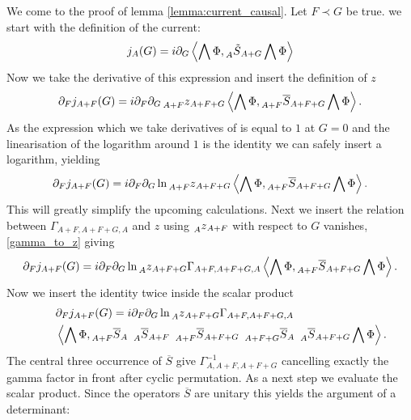 \documentclass[oneside,reqno,12pt]{amsart}
\begin{document}
We come to the proof of lemma \ref{lemma:current_causal}. Let \(F\prec G\) be true. we start with the definition of the current:
\begin{align*}
j_A(G)= i \partial_G \left\langle  \bigwedge \Phi, \prescript{}{A}{\tilde{S}}_{A+G} \bigwedge \Phi\right\rangle
\end{align*}
Now we take the derivative of this expression and insert the definition of \(z\)
\begin{align*}
\partial_F j_{A+F}(G)=i \partial_F \partial_G \prescript{}{A+F}{z}_{A+F+G} \left\langle  \bigwedge \Phi, \prescript{}{A+F}{\overline{S}}_{A+F+G} \bigwedge \Phi\right\rangle.
\end{align*}
As the expression which we take derivatives of is equal to \(1\) at \(G=0\) and the linearisation of the logarithm around \(1\) is the identity we can safely insert a logarithm, yielding
\begin{align*}
\partial_F j_{A+F}(G)=i \partial_F \partial_G \ln \prescript{}{A+F}{z}_{A+F+G} \left\langle  \bigwedge \Phi, \prescript{}{A+F}{\overline{S}}_{A+F+G} \bigwedge \Phi\right\rangle.
\end{align*}
This will greatly simplify the upcoming calculations. Next we insert the relation between \(\Gamma_{A+F,A+F+G,A}\) and \(z\) using \(\prescript{}{A}{z}_{A+F}\) with respect to \(G\) vanishes, \eqref{gamma_to_z} giving
\begin{align*}
\partial_F j_{A+F}(G)=i \partial_F \partial_G \ln  \prescript{}{A}{z}_{A+F+G} \Gamma_{A+F,A+F+G,A} \left\langle  \bigwedge \Phi, \prescript{}{A+F}{\overline{S}}_{A+F+G} \bigwedge \Phi\right\rangle.
\end{align*}
Now we insert the identity twice inside the scalar product
\begin{align}\tag*{}
&\partial_F j_{A+F}(G)=i \partial_F \partial_G \ln  \prescript{}{A}{z}_{A+F+G} \Gamma_{A+F,A+F+G,A} \\
&\left\langle  \bigwedge \Phi, \prescript{}{A+F}{\overline{S}}_A~ \prescript{}{A}{\overline{S}}_{A+F}~ \prescript{}{A+F}{\overline{S}}_{A+F+G}~ \prescript{}{A+F+G}{\overline{S}}_{A} ~\prescript{}{A}{\overline{S}}_{A+F+G}  \bigwedge \Phi\right\rangle.
\end{align}
The central three occurrence of \(\overline{S}\) give \(\Gamma^{-1}_{A,A+F,A+F+G}\) cancelling exactly the gamma factor in front after cyclic permutation. As a next step we evaluate the scalar product. Since the operators \(\overline{S}\) are unitary this yields the argument of a determinant:
\end{document}
